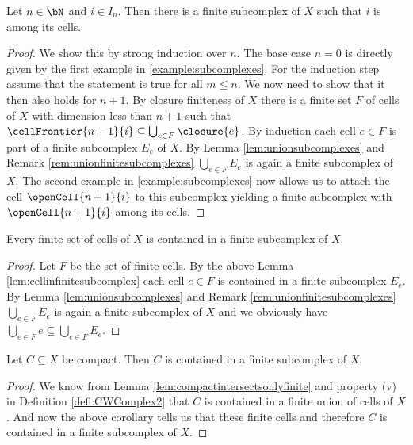 \begin{lem} \label{lem:cellinfinitesubcomplex}
    Let $n \in \bN$ and $i \in I_n$. 
    Then there is a finite subcomplex of $X$ such that $i$ is among its cells. 
    \href{https://github.com/scholzhannah/CWComplexes/blob/7be4872a05b534011cc969eb5b80a4b7f0bf57e2/CWcomplexes/subcomplex.lean#L336-L364}{\faExternalLink}
\end{lem}
\begin{proof}
    We show this by strong induction over $n$. 
    The base case $n = 0$ is directly given by the first example in \ref{example:subcomplexes}. 
    For the induction step assume that the statement is true for all $m \le n$.
    We now need to show that it then also holds for $n + 1$. 
    By closure finiteness of $X$ there is a finite set $F$ of cells of $X$ with dimension less than $n + 1$ such that $\cellFrontier{n  + 1}{i} \subseteq \bigcup_{e \in F} \closure{e}$. 
    By induction each cell $e \in F$ is part of a finite subcomplex $E_e$ of $X$. 
    By Lemma \ref{lem:unionsubcomplexes} and Remark \ref{rem:unionfinitesubcomplexes} $\bigcup_{e \in F}E_e$ is again a finite subcomplex of $X$. 
    The second example in \ref{example:subcomplexes} now allows us to attach the cell $\openCell{n + 1}{i}$ to this subcomplex yielding a finite subcomplex with $\openCell{n + 1}{i}$ among its cells.
\end{proof}

\begin{cor}
    Every finite set of cells of $X$ is contained in a finite subcomplex of $X$. \href{https://github.com/scholzhannah/CWComplexes/blob/7be4872a05b534011cc969eb5b80a4b7f0bf57e2/CWcomplexes/subcomplex.lean#L374-L384}{\faExternalLink}
\end{cor}
\begin{proof}
    Let $F$ be the set of finite cells. 
    By the above Lemma \ref{lem:cellinfinitesubcomplex} each cell $e \in F$ is contained in a finite subcomplex $E_e$. 
    By Lemma \ref{lem:unionsubcomplexes} and Remark \ref{rem:unionfinitesubcomplexes} $\bigcup_{e \in F}E_e$ is again a finite subcomplex of $X$ and we obviously have $\bigcup_{e \in F} e \subseteq \bigcup_{e \in F}E_e$.
\end{proof}

\begin{cor} \label{cor:compactinfinitesubcomplex}
    Let $C \subseteq X$ be compact. 
    Then $C$ is contained in a finite subcomplex of $X$. 
    \href{https://github.com/scholzhannah/CWComplexes/blob/7be4872a05b534011cc969eb5b80a4b7f0bf57e2/CWcomplexes/subcomplex.lean#L386-L397}{\faExternalLink}
\end{cor}
\begin{proof}
    We know from Lemma \ref{lem:compactintersectsonlyfinite} and property (v) in Definition \ref{defi:CWComplex2} that $C$ is contained in a finite union of cells of $X$. 
    And now the above corollary tells us that these finite cells and therefore $C$ is contained in a finite subcomplex of $X$.
\end{proof}